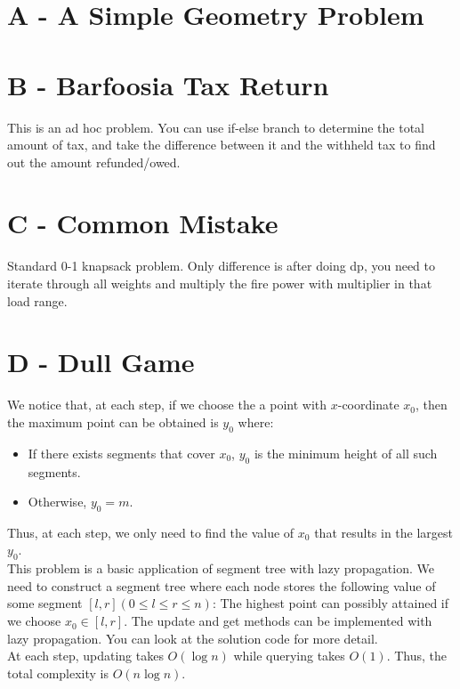 \documentclass{article}
\begin{document}
\section*{A - A Simple Geometry Problem}



\section*{B - Barfoosia Tax Return}

This is an ad hoc problem. You can use if-else branch to determine the total amount of tax, and take the difference between it and the withheld tax to find out the amount refunded/owed. 

\section*{C - Common Mistake}
Standard 0-1 knapsack problem. Only difference is after doing dp, you need to iterate through all weights and multiply the fire power with multiplier in that load range.

\section*{D - Dull Game}
We notice that, at each step, if we choose the a point with $x$-coordinate $x_0$, then the maximum
point can be obtained is $y_0$ where:
\begin{itemize}
\item
If there exists segments that cover $x_0$, $y_0$ is the minimum height of all such segments.
\item
Otherwise, $y_0 = m$.
\end{itemize}
Thus, at each step, we only need to find the value of $x_0$ that results in the largest $y_0$.\\

\noindent This problem is a basic application of segment tree with lazy propagation. We need to construct a
segment tree where each node stores the following value of some segment $[l, r] (0 \leq l \leq r \leq n)$:
The highest point can possibly attained if we choose $x_0 \in [l, r]$. The update and get methods can be
implemented with lazy propagation. You can look at the solution code for more detail.\\

At each step, updating takes $O(\log{n})$ while querying takes $O(1)$. Thus, the total complexity is $O(n\log{n})$.
\end{document}
